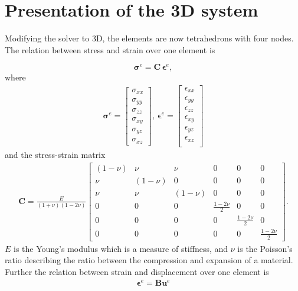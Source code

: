 \section{Presentation of the 3D system}
Modifying the solver to 3D, the elements are now tetrahedrons with four nodes. The relation between stress and strain over one element is

\begin{equation}
\label{stress-strain}
\bm{\sigma}^e = \bm{C} \, \bm{\epsilon}^e,
\end{equation}
where
\begin{align*}
\bm{\sigma}^e =
\begin{bmatrix}
\sigma_{xx} \\
\sigma_{yy} \\
\sigma_{zz} \\
\sigma_{xy} \\
\sigma_{yz} \\
\sigma_{xz}
\end{bmatrix}, \,
\bm{\epsilon}^e = 
\begin{bmatrix}
\epsilon_{xx} \\
\epsilon_{yy} \\
\epsilon_{zz} \\
\epsilon_{xy} \\
\epsilon_{yz} \\
\epsilon_{xz} \\
\end{bmatrix}
\end{align*}
and the stress-strain matrix \cite{ppt}
\begin{align}
\bm{C} = \frac{E}{(1+\nu)(1-2\nu)}
\begin{bmatrix}
(1-\nu) & \nu & \nu & 0 & 0 & 0 \\
\nu & (1-\nu) & 0 & 0 & 0 & 0 \\
\nu & \nu & (1-\nu) & 0 & 0 & 0 \\
0 & 0 & 0 & \frac{1-2\nu}{2} & 0 & 0 \\
0 & 0 & 0 & 0 & \frac{1-2\nu}{2} & 0 \\
0 & 0 & 0 & 0 & 0 & \frac{1-2\nu}{2}
\end{bmatrix}.
\label{eq:C}
\end{align}
$E$ is the Young's modulus which is a measure of stiffness, and $\nu$ is the Poisson's ratio describing the ratio between the compression and expansion of a material. Further the relation between strain and displacement over one element is 
\begin{align}
\label{strain-displacement}
\bm{\epsilon}^e = \bm{B} \bm{u}^e
\end{align}
